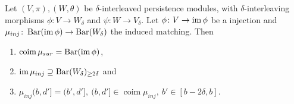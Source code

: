 \begin{lemma} \label{lemma:inj-image}
    Let $ (V, \pi), (W, \theta) $ be $\delta$-interleaved persistence modules, with $\delta$-inter\-leaving morphisms $ \phi\colon V \to W_\delta $ and $ \psi\colon W \to V_\delta $. Let $ \phi\colon V \to \operatorname{im}\phi $ be a injection and $ \mu_{inj}\colon \operatorname{Bar}(\operatorname{im} \phi) \to \operatorname{Bar} (W_\delta)$ the induced matching. Then
    \begin{enumerate}
        \item $\operatorname{coim} \mu_{sur} = \operatorname{Bar} (\operatorname{im} \phi) $,
        \item $ \operatorname{im} \mu_{inj} \supseteq \operatorname{Bar} (W_\delta)_{\geq 2\delta} $ and
        \item $ \mu_{inj}(b, d'] = (b', d'], \ (b, d'] \in \operatorname{coim} \mu_{inj}, \ b' \in [b-2\delta, b]$.
    \end{enumerate}
\end{lemma}
